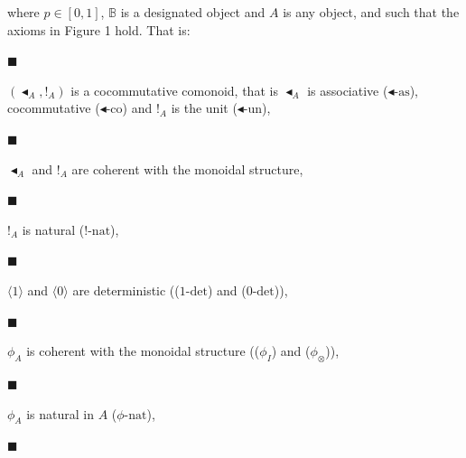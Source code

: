 where $p\in[0,1]$, $\mathbb{B}$ is a designated object and $A$ is any object, and such that the axioms in Figure 1 hold. That is:\par
  
\par\noindent  $\blacksquare$ 
 
$(\blacktriangleleft_{A},!_{A})$ is a cocommutative comonoid, that is $\blacktriangleleft_{A}$ is associative ($\blacktriangleleft\text{-as}$), cocommutative ($\blacktriangleleft\text{-co}$) and $!_{A}$ is the unit ($\blacktriangleleft\text{-un}$),\par
 
 
 
\par\noindent  $\blacksquare$ 
 
$\blacktriangleleft_{A}$ and $!_{A}$ are coherent with the monoidal structure,\par
 
 
 
\par\noindent  $\blacksquare$ 
 
$!_{A}$ is natural ($!\text{-nat}$),\par
 
 
 
\par\noindent  $\blacksquare$ 
 
$\langle 1\rangle$ and $\langle 0\rangle$ are deterministic (($1\text{-det}$) and ($0\text{-det}$)),\par
 
 
 
\par\noindent  $\blacksquare$ 
 
$\phi_{A}$ is coherent with the monoidal structure (($\phi_I$) and ($\phi_{\otimes}$)),\par
 
 
 
\par\noindent  $\blacksquare$ 
 
$\phi_{A}$ is natural in $A$ ($\phi\text{-nat}$),\par
 
 
 
\par\noindent  $\blacksquare$ 
 
